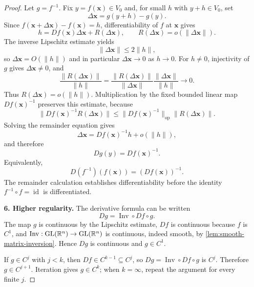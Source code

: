 \begin{proof}
Let $g=f^{-1}$. Fix $y=f(\mathbf{x})\in V_0$ and, for small $h$ with
$y+h\in V_0$, set
\[
\Delta \mathbf{x}=g(y+h)-g(y).
\]
Since $f(\mathbf{x}+\Delta \mathbf{x})-f(\mathbf{x})=h$, differentiability of $f$ at $\mathbf{x}$ gives
\[
h=Df(\mathbf{x})\Delta \mathbf{x}+R(\Delta \mathbf{x}),
\qquad R(\Delta \mathbf{x})=o(\|\Delta \mathbf{x}\|).
\]
The inverse Lipschitz estimate yields
\[
\|\Delta \mathbf{x}\|\leq2\|h\|,
\]
so $\Delta \mathbf{x}=O(\|h\|)$ and in particular $\Delta \mathbf{x}\to0$ as $h\to0$.
For $h\ne0$, injectivity of $g$ gives $\Delta \mathbf{x}\ne0$, and
\[
\frac{\|R(\Delta \mathbf{x})\|}{\|h\|}
=
\frac{\|R(\Delta \mathbf{x})\|}{\|\Delta \mathbf{x}\|}
\frac{\|\Delta \mathbf{x}\|}{\|h\|}
\longrightarrow0.
\]
Thus $R(\Delta \mathbf{x})=o(\|h\|)$. Multiplication by the fixed bounded linear
map $Df(\mathbf{x})^{-1}$ preserves this estimate, because
\[
\|Df(\mathbf{x})^{-1}R(\Delta \mathbf{x})\|
\leq\|Df(\mathbf{x})^{-1}\|_{\mathrm{op}}\|R(\Delta \mathbf{x})\|.
\]
Solving the remainder equation gives
\[
\Delta \mathbf{x}=Df(\mathbf{x})^{-1}h+o(\|h\|),
\]
and therefore
\[
Dg(y)=Df(\mathbf{x})^{-1}.
\]
Equivalently,
\[
D(f^{-1})(f(\mathbf{x}))=(Df(\mathbf{x}))^{-1}.
\]
The remainder calculation establishes differentiability before the identity
$f^{-1}\circ f=\operatorname{id}$ is differentiated.

\noindent\textbf{6. Higher regularity.}
The derivative formula can be written
\[
Dg=\operatorname{Inv}\circ Df\circ g.
\]
The map $g$ is continuous by the Lipschitz estimate, $Df$ is continuous
because $f$ is $C^1$, and
$\operatorname{Inv}:\operatorname{GL}(\mathbb{R}^n)\to\operatorname{GL}(\mathbb{R}^n)$
is continuous, indeed smooth, by \cref{lem:smooth-matrix-inversion}.
Hence $Dg$ is continuous and $g\in C^1$.

If $g\in C^j$ with $j<k$, then
$Df\in C^{k-1}\subseteq C^j$, so
$Dg=\operatorname{Inv}\circ Df\circ g$ is $C^j$. Therefore
$g\in C^{j+1}$. Iteration gives $g\in C^k$; when $k=\infty$, repeat the
argument for every finite $j$.


\end{proof}
